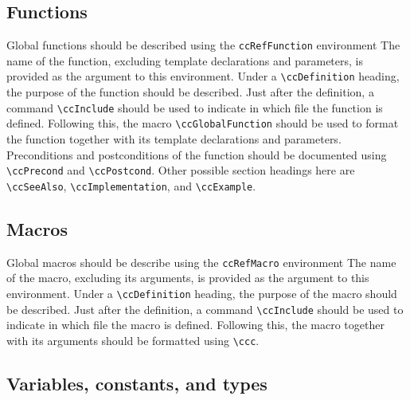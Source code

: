 \subsection{Functions}
\label{sec:ref_function}

Global functions should be described using the {\tt ccRefFunction} environment%
The name of the function, excluding template declarations and parameters,
is provided as the argument to this environment.  Under a \verb|\ccDefinition|
heading, the purpose of the function should be described. Just after the
definition, a command \verb|\ccInclude| should be used to indicate in which
file the function is defined.  Following this, the macro
\verb|\ccGlobalFunction| should be used to format the function together with its
template declarations and parameters.  Preconditions and postconditions 
of the function should be documented using \verb|\ccPrecond| and 
\verb|\ccPostcond|. Other possible section headings here are
\verb|\ccSeeAlso|, \verb|\ccImplementation|, and \verb|\ccExample|.

\subsection{Macros}
\label{sec:ref_macro}

Global macros should be describe using the {\tt ccRefMacro} environment%
The name of the macro, excluding its arguments, is provided as the argument
to this environment.  Under a \verb|\ccDefinition| heading, the purpose of
the macro should be described.  Just after the definition, a command 
\verb|\ccInclude| should be used to indicate in which file the macro is 
defined.  Following this, the macro together with its arguments should 
be formatted using \verb|\ccc|.  

\subsection{Variables, constants, and types}
\label{sec:ref_variable}

